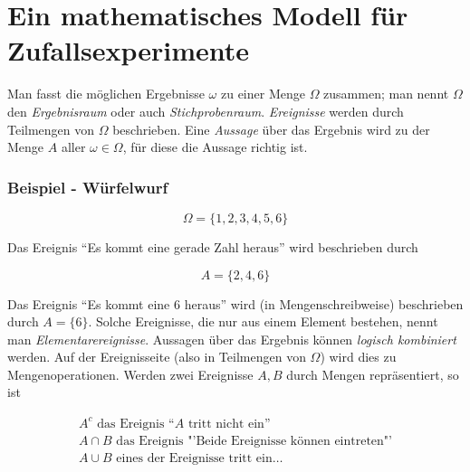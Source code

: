 



\part{Ein mathematisches Modell für Zufallsexperimente}

Man fasst die möglichen Ergebnisse $\omega$ zu einer Menge $\Omega$ zusammen; man nennt $\Omega$ den \textit{Ergebnisraum} oder auch \textit{Stichprobenraum}. \textit{Ereignisse} werden durch Teilmengen von $\Omega$ beschrieben.
Eine \textit{Aussage} über das Ergebnis wird zu der Menge $A$ aller $\omega \in \Omega$, für diese die Aussage richtig ist.

\section{Beispiel - Würfelwurf}

\begin{displaymath}
\Omega = \{1,2,3,4,5,6\}
\end{displaymath}

Das Ereignis ``Es kommt eine gerade Zahl heraus'' wird beschrieben durch

\begin{displaymath}
A = \{2,4,6\}
\end{displaymath}

Das Ereignis ``Es kommt eine 6 heraus'' wird (in Mengenschreibweise) beschrieben durch $A = \{6\}$.
Solche Ereignisse, die nur aus einem Element bestehen, nennt man \textit{Elementarereignisse}.
Aussagen über das Ergebnis können \textit{logisch kombiniert} werden. Auf der Ereignisseite (also in Teilmengen von $\Omega$) wird dies zu Mengenoperationen. Werden zwei Ereignisse $A, B$ durch Mengen repräsentiert, so ist

\begin{eqnarray*}
A^c \text{ das Ereignis ``$A$ tritt nicht ein''}\\
A \cap B \text{ das Ereignis "'Beide Ereignisse können eintreten"'}\\
A \cup B \text{ eines der Ereignisse tritt ein}
\ldots
\end{eqnarray*}

